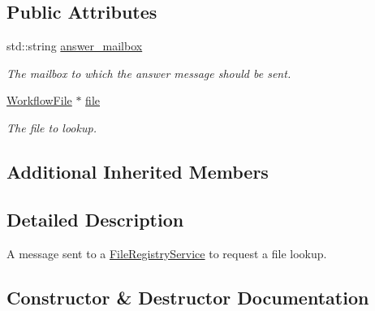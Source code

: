 \subsection*{Public Attributes}
\begin{DoxyCompactItemize}
\item 
\mbox{\label{classwrench_1_1_file_registry_file_lookup_request_message_ae22012c8e5a15901991271f4b5c41d53}} 
std\+::string \hyperlink{classwrench_1_1_file_registry_file_lookup_request_message_ae22012c8e5a15901991271f4b5c41d53}{answer\+\_\+mailbox}
\begin{DoxyCompactList}\small\item\em The mailbox to which the answer message should be sent. \end{DoxyCompactList}\item 
\mbox{\label{classwrench_1_1_file_registry_file_lookup_request_message_a53d0aa754b0de04293cb084486e10ca7}} 
\hyperlink{classwrench_1_1_workflow_file}{Workflow\+File} $\ast$ \hyperlink{classwrench_1_1_file_registry_file_lookup_request_message_a53d0aa754b0de04293cb084486e10ca7}{file}
\begin{DoxyCompactList}\small\item\em The file to lookup. \end{DoxyCompactList}\end{DoxyCompactItemize}
\subsection*{Additional Inherited Members}


\subsection{Detailed Description}
A message sent to a \hyperlink{classwrench_1_1_file_registry_service}{File\+Registry\+Service} to request a file lookup. 

\subsection{Constructor \& Destructor Documentation}
\mbox{\label{classwrench_1_1_file_registry_file_lookup_request_message_a4945e659bceef2bf19d37a469d5bf79f}} 
